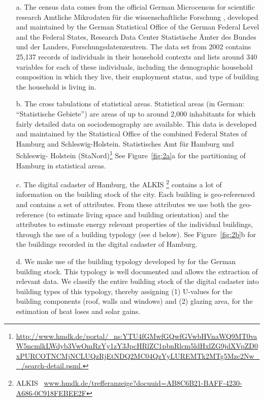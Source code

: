 \documentclass[11pt]{IJM-article}
\begin{document}
\begin{enumerate}\itemsep4ex
    \item[a.] The census data comes from the official German Microcensus for
        scientific research Amtliche Mikrodaten für die wissenschaftliche
        Forschung , developed and maintained by the German
        Statistical Office of the German Federal Level and the Federal States,
        Research Data Center Statistische Ämter des Bundes und der Landers,
        Forschungsdatenzentren.  The data set from 2002 contains 25,137 records
        of individuals in their household contexts and lists around 340
        variables for each of these individuals, including the demographic
        household composition in which they live, their employment status, and
        type of building the household is living in.
    \item[b.] The cross tabulations of statistical areas. Statistical areas (in
        German: ``Statistische Gebiete'') are areas of up to around 2,000
        inhabitants for which fairly detailed data on sociodemography are
        available. This data is developed and maintained by the Statistical
        Office of the combined Federal States of Hamburg and
        Schleswig-Holstein. Statistisches Amt für Hamburg und Schleswig-
        Holstein (StaNord)\footnote{\url{http://www.hmdk.de/portal/_ns:YTU4fGMwfGQwfGVwbHVnaWQ9MT0vaW5ncmlkLWdyb3VwOmRzYy1zY3JpcHRlZC1pbnRlcm5ldHxlZG9jdXVpZD0xPURCOTNCMjNCLUQzRjEtNDQ2MC04QzYyLUREMTk2MTg5Mzc2Nw__/search-detail.psml.}}
        See Figure~\ref{fig:2a}a for the partitioning of Hamburg in statistical
        areas.
    \item[c.] The digital cadaster of Hamburg, the ALKIS \footnote{ALKIS~\cite{ALKIS}
        \url{www.hmdk.de/trefferanzeige?docuuid=AB8C6B21-BAFF-4230-A686-0C918FEBEE2F}}
        contains a lot of information on the building stock of the city.  Each
        building is geo-referenced and contains a set of attributes.  From
        these attributes we use both the geo-reference (to estimate living
        space and building orientation) and the attributes to estimate energy
        relevant properties of the individual buildings, through the use of a
        building typology (see d below). See Figure~\ref{fig:2b}b for the
        buildings recorded in the digital cadaster of Hamburg.
    \item[d.] We make use of the building typology developed by
         for the German building stock. This typology is well
        documented and allows the extraction of relevant data. We classify the
        entire building stock of the digital cadaster into building types of
        this typology, thereby assigning (1) U-values for the building
        components (roof, walls and windows) and (2) glazing area, for the
        estimation of heat loses and solar gains.
\end{enumerate}
\end{document}
